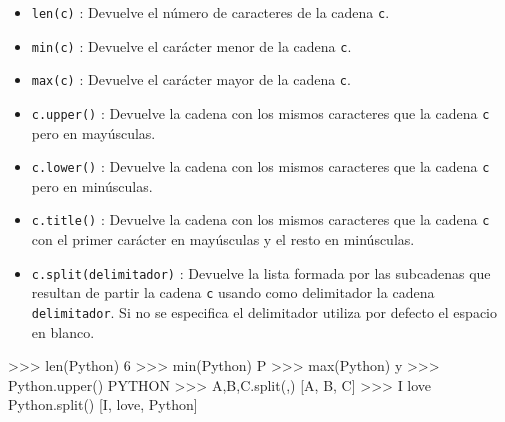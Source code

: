 \documentclass[
  spanish,
  a4paper,
]{scrreport}
\newenvironment{Shaded}{\begin{snugshade}}{\end{snugshade}}
\newcommand{\BuiltInTok}[1]{\textcolor[rgb]{0.00,0.23,0.31}{#1}}
\newcommand{\CommentTok}[1]{\textcolor[rgb]{0.37,0.37,0.37}{#1}}
\newcommand{\DecValTok}[1]{\textcolor[rgb]{0.68,0.00,0.00}{#1}}
\newcommand{\NormalTok}[1]{\textcolor[rgb]{0.00,0.23,0.31}{#1}}
\newcommand{\OperatorTok}[1]{\textcolor[rgb]{0.37,0.37,0.37}{#1}}
\newcommand{\StringTok}[1]{\textcolor[rgb]{0.13,0.47,0.30}{#1}}
\providecommand{\tightlist}{%
  \setlength{\itemsep}{0pt}\setlength{\parskip}{0pt}}
\begin{document}
\begin{itemize}
\tightlist
\item
  \texttt{len(c)} : Devuelve el número de caracteres de la cadena
  \texttt{c}.
\item
  \texttt{min(c)} : Devuelve el carácter menor de la cadena \texttt{c}.
\item
  \texttt{max(c)} : Devuelve el carácter mayor de la cadena \texttt{c}.
\item
  \texttt{c.upper()} : Devuelve la cadena con los mismos caracteres que
  la cadena \texttt{c} pero en mayúsculas.
\item
  \texttt{c.lower()} : Devuelve la cadena con los mismos caracteres que
  la cadena \texttt{c} pero en minúsculas.
\item
  \texttt{c.title()} : Devuelve la cadena con los mismos caracteres que
  la cadena \texttt{c} con el primer carácter en mayúsculas y el resto
  en minúsculas.
\item
  \texttt{c.split(delimitador)} : Devuelve la lista formada por las
  subcadenas que resultan de partir la cadena \texttt{c} usando como
  delimitador la cadena \texttt{delimitador}. Si no se especifica el
  delimitador utiliza por defecto el espacio en blanco.
\end{itemize}

\begin{Shaded}
\begin{Highlighting}[]
\OperatorTok{\textgreater{}\textgreater{}\textgreater{}} \BuiltInTok{len}\NormalTok{(}\StringTok{\textquotesingle{}Python\textquotesingle{}}\NormalTok{)}
\DecValTok{6}
\OperatorTok{\textgreater{}\textgreater{}\textgreater{}} \BuiltInTok{min}\NormalTok{(}\StringTok{\textquotesingle{}Python\textquotesingle{}}\NormalTok{)}
\CommentTok{\textquotesingle{}P\textquotesingle{}}
\OperatorTok{\textgreater{}\textgreater{}\textgreater{}} \BuiltInTok{max}\NormalTok{(}\StringTok{\textquotesingle{}Python\textquotesingle{}}\NormalTok{)}
\CommentTok{\textquotesingle{}y\textquotesingle{}}
\OperatorTok{\textgreater{}\textgreater{}\textgreater{}} \StringTok{\textquotesingle{}Python\textquotesingle{}}\NormalTok{.upper()}
\CommentTok{\textquotesingle{}PYTHON\textquotesingle{}}
\OperatorTok{\textgreater{}\textgreater{}\textgreater{}} \StringTok{\textquotesingle{}A,B,C\textquotesingle{}}\NormalTok{.split(}\StringTok{\textquotesingle{},\textquotesingle{}}\NormalTok{)}
\NormalTok{[}\StringTok{\textquotesingle{}A\textquotesingle{}}\NormalTok{, }\StringTok{\textquotesingle{}B\textquotesingle{}}\NormalTok{, }\StringTok{\textquotesingle{}C\textquotesingle{}}\NormalTok{]}
\OperatorTok{\textgreater{}\textgreater{}\textgreater{}} \StringTok{\textquotesingle{}I love Python\textquotesingle{}}\NormalTok{.split()}
\NormalTok{[}\StringTok{\textquotesingle{}I\textquotesingle{}}\NormalTok{, }\StringTok{\textquotesingle{}love\textquotesingle{}}\NormalTok{, }\StringTok{\textquotesingle{}Python\textquotesingle{}}\NormalTok{]}
\end{Highlighting}
\end{Shaded}
\end{document}
